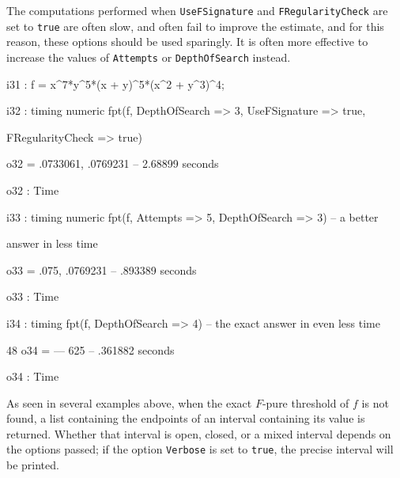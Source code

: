 \documentclass{amsart}
\begin{document}
The computations performed when {\tt UseFSignature} and {\tt FRegularityCheck} are set to {\tt true} are often slow, and often fail to improve the estimate, and for this reason, these options should be used sparingly.
            It is often more effective to increase the values of {\tt Attempts} or {\tt DepthOfSearch} instead.

{\small
{}
\begin{MyVerbatim}

i31 : f = x^7*y^5*(x + y)^5*(x^2 + y^3)^4;

i32 : timing numeric fpt(f, DepthOfSearch => 3, UseFSignature => true,

      FRegularityCheck => true)

o32 = {.0733061, .0769231}
      -- 2.68899 seconds

o32 : Time

i33 : timing numeric fpt(f, Attempts => 5, DepthOfSearch => 3) -- a better

      answer in less time

o33 = {.075, .0769231}
      -- .893389 seconds

o33 : Time

i34 : timing fpt(f, DepthOfSearch => 4) -- the exact answer in even less
      time

       48
o34 = ---
      625
      -- .361882 seconds

o34 : Time
\end{MyVerbatim}
}
\medspace

As seen in several examples above, when the exact  $F$-pure threshold of $f$ is not found, a list containing the endpoints of an interval containing its value is returned.  Whether that interval is open, closed, or a mixed interval depends on the options passed; if the option {\tt Verbose} is set to {\tt true}, the precise interval will be printed.
\end{document}
